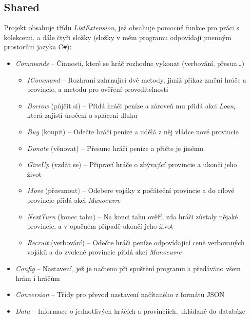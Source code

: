 \documentclass[a4paper,12pt]{article}
\def\CS{C\texttt{\#}}
\begin{document}
\subsection{Shared}
Projekt obsahuje třídu \textit{ListExtension}, jež obsahuje pomocné funkce pro práci s kolekcemi, a dále čtyři složky (složky v mém programu odpovídají jmenným prostorům jazyka  \CS{}):
\begin{itemize}
\item\textit{Commands} -- Činnosti, které se hráč rozhodne vykonat (verbování, přesun\ldots)
\begin{itemize}
\item\textit{ICommand} -- Rozhraní zahrnující dvě metody, jimiž příkaz změní hráče a provincie, a metodu pro ověření proveditelnosti
\item\textit{Borrow} (půjčit si) -- Přidá hráči peníze a zároveň mu přidá akci \textit{Loan}, která zajistí úročení a splácení dluhu
\item\textit{Buy} (koupit) -- Odečte hráči peníze a udělá z něj vládce nové provincie
\item\textit{Donate} (věnovat) -- Přesune hráči peníze a přičte je jinému
\item\textit{GiveUp} (vzdát se) -- Připraví hráče o zbývající provincie a ukončí jeho život
\item\textit{Move} (přesunout) -- Odebere vojáky z počáteční provincie a do cílové provincie přidá akci \textit{Manoeuvre}
\item\textit{NextTurn} (konec tahu) -- Na konci tahu ověří, zda hráči zůstaly nějaké provincie, a v opačném případě ukončí jeho život
\item\textit{Recruit} (verbování) -- Odečte hráči peníze odpovídající ceně verbovaných vojáků a do zvolené provincie přidá akci \textit{Manoeuvre}
\end{itemize}
\item\textit{Config} -- Nastavení, jež je načteno při spuštění programu a předáváno všem hrám i hráčům
\item\textit{Conversion} -- Třídy pro převod nastavení načítaného z formátu JSON
\item\textit{Data} -- Informace o jednotlivých hráčích a provinciích, ukládané do databáze
\end{itemize}
\end{document}
